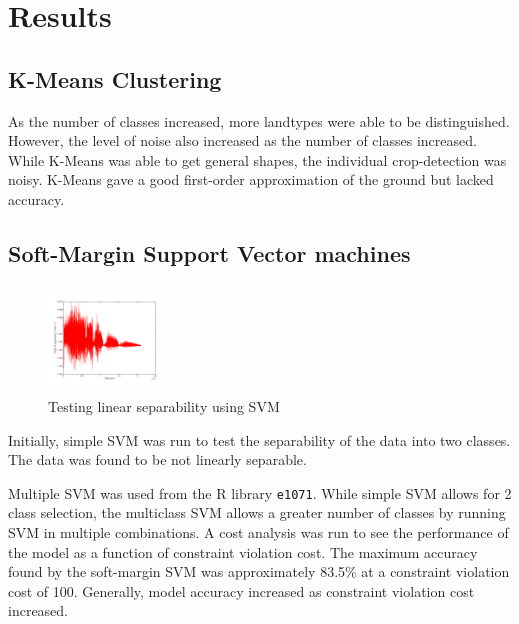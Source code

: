 \documentclass[10pt,letterpaper]{article}
\begin{document}
\section{Results}
\subsection{K-Means Clustering}
As the number of classes increased, more landtypes were able to be distinguished. However, the level of noise also increased as the number of classes increased. While K-Means was able to get general shapes, the individual crop-detection was noisy. K-Means gave a good first-order approximation of the ground but lacked accuracy.
\subsection{Soft-Margin Support Vector machines}
\begin{figure}\vspace{-20pt}
\begin{center}
\includegraphics[width=0.28\textwidth, height=80pt]{../Presentation/softsvmImage.png}
\caption{Testing linear separability using SVM}
\end{center}
\end{figure}
Initially, simple SVM was run to test the separability of the data into two classes. The data was found to be not linearly separable.

Multiple SVM was used from the R library \texttt{e1071}. While simple SVM allows for 2 class selection, the multiclass SVM allows a greater number of classes by running SVM in multiple combinations. A cost analysis was run to see the performance of the model as a function of constraint violation cost. The maximum accuracy found by the soft-margin SVM was approximately 83.5\% at a constraint violation cost of 100. Generally, model accuracy increased as constraint violation cost increased.
\end{document}
